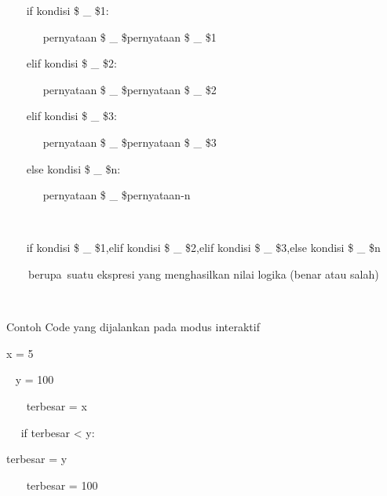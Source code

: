 \vspace{12pt}
\noindent 
~~~ if kondisi \$  \_  \$1: \par
\vspace{12pt}
\noindent 
~~~~~~ pernyataan \$  \_  \$pernyataan \$  \_  \$1 \par
\vspace{12pt}
\noindent 
~~~ elif kondisi \$  \_  \$2: \par
\vspace{12pt}
\noindent 
~~~~~~ pernyataan \$  \_  \$pernyataan \$  \_  \$2 \par
\vspace{12pt}
\noindent 
~~~ elif kondisi \$  \_  \$3: \par
\vspace{12pt}
\noindent 
~~~~~~ pernyataan \$  \_  \$pernyataan \$  \_  \$3 \par
\vspace{12pt}
\noindent 
~~~ else kondisi \$  \_  \$n: \par
\vspace{12pt}
\noindent 
~~~~~~ pernyataan \$  \_  \$pernyataan-n \par
\vspace{12pt}
\noindent 
~~~~~~  \par
\noindent 
~~~ if kondisi \$  \_  \$1,elif kondisi \$  \_  \$2,elif kondisi \$  \_  \$3,else kondisi \$  \_  \$n \par
\vspace{12pt}
\noindent 
~~~~berupa~suatu ekspresi yang menghasilkan nilai logika (benar atau salah)    \par
\noindent 
~~~  \par
\noindent 
Contoh Code yang dijalankan pada modus interaktif \par
\vspace{12pt}
\noindent 
  x = 5 \par
\vspace{12pt}
\noindent 
~ y = 100 \par
\vspace{12pt}
\noindent 
~~~ terbesar = x \par
\vspace{12pt}
\noindent 
~~ if terbesar < y: \par
\vspace{12pt}
\noindent 
terbesar = y \par
\vspace{12pt}
~~~ terbesar = 100  \par
\vspace{12pt}
